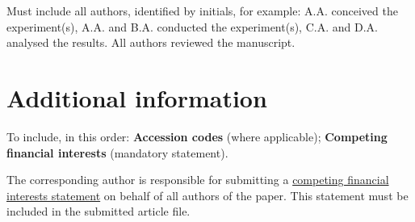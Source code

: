 \documentclass[fleqn,10pt]{wlscirep}
\begin{document}
Must include all authors, identified by initials, for example:
A.A. conceived the experiment(s), A.A. and B.A. conducted the
experiment(s), C.A. and D.A. analysed the results. All authors
reviewed the manuscript.

\section*{Additional information}

To include, in this order: \textbf{Accession codes} (where
applicable); \textbf{Competing financial interests} (mandatory
statement).

The corresponding author is responsible for submitting a
\href{http://www.nature.com/srep/policies/index.html#competing}{competing
  financial interests statement} on behalf of all authors of the
paper. This statement must be included in the submitted article file.
\end{document}
